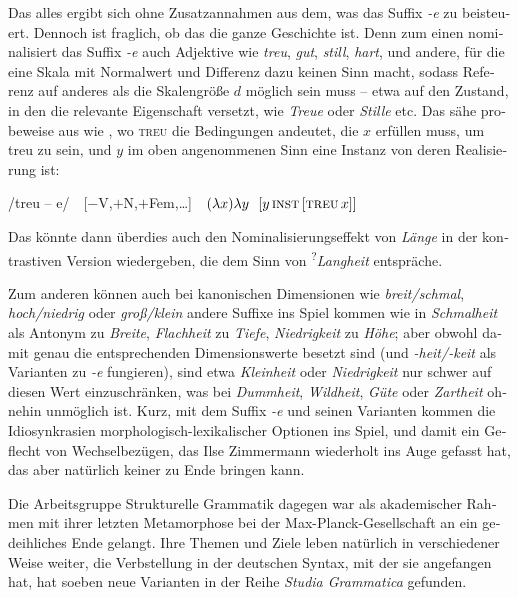 \documentclass[output=paper,colorlinks,citecolor=brown]{langscibook}
\begin{document}
\begin{otherlanguage}{german}
\largerpage
Das alles ergibt sich ohne Zusatzannahmen aus dem, was das Suffix \textit{-e} zu  beisteuert. Dennoch ist fraglich, ob das die ganze Geschichte ist. Denn zum einen nominalisiert das Suffix \textit{-e} auch Adjektive wie \textit{treu}, \textit{gut}, \textit{still}, \textit{hart}, und andere, für die eine Skala mit Normalwert und Differenz dazu keinen Sinn macht, sodass Referenz auf anderes als die Skalengröße $d$ möglich sein muss -- etwa auf den Zustand, in den die relevante Eigenschaft versetzt, wie \textit{Treue} oder \textit{Stille} etc. Das sähe probeweise aus wie , wo \textsc{treu} die Bedingungen andeutet, die $x$ erfüllen muss, um treu zu sein, und $y$ im oben angenommenen Sinn eine Instanz von deren Realisierung ist:

\ea /treu -- e/ \,\, [$-$V,$+$N,$+$Fem,\dots] \,\, $(\lambda x) \lambda y \,\,\,\, [ y\, \textsc{inst}\, [\textsc{treu}\, x ]]$
\label{ex:23}
\z 

\noindent Das könnte dann überdies auch den Nominalisierungseffekt von \textit{Länge} in der kontrastiven Version wiedergeben, die dem Sinn von \textsuperscript{?}\textit{Langheit} entspräche.

Zum anderen können auch bei kanonischen Dimensionen wie \textit{breit/schmal}, \textit{hoch/niedrig} oder \textit{groß/klein} andere Suffixe ins Spiel kommen wie in \textit{Schmalheit} als Antonym zu \textit{Breite}, \textit{Flachheit} zu \textit{Tiefe}, \textit{Niedrigkeit} zu \textit{Höhe}; aber obwohl damit genau die entsprechenden Dimensionswerte besetzt sind (und \textit{-heit/-keit} als Varianten zu \textit{-e} fungieren), sind etwa \textit{Kleinheit} oder \textit{Niedrigkeit} nur schwer auf diesen Wert einzuschränken, was bei \textit{Dummheit}, \textit{Wildheit}, \textit{Güte} oder \textit{Zartheit} ohnehin unmöglich ist. Kurz, mit dem Suffix \textit{-e} und seinen Varianten kommen die Idiosynkrasien morphologisch-lexikalischer Optionen ins Spiel, und damit ein Geflecht von Wechselbezügen, das Ilse Zimmermann wiederholt ins Auge gefasst hat, das aber natürlich keiner zu Ende bringen kann.

Die Arbeitsgruppe Strukturelle Grammatik dagegen war als akademischer Rahmen mit ihrer letzten Metamorphose bei der Max-Planck-Gesellschaft an ein gedeihliches Ende gelangt. Ihre Themen und Ziele leben natürlich in verschiedener Weise weiter, die Verbstellung in der deutschen Syntax, mit der sie angefangen hat, hat soeben neue Varianten in der Reihe \textit{Studia Grammatica} gefunden.


\end{otherlanguage}
\end{document}
